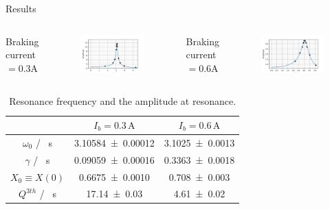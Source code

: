 \begin{frame}{Results}
\vspace{0.3cm}
\begin{columns}
\Large \centering Braking current $=0.3\si{\ampere}$
\begin{figure}[t]
	\includegraphics[width=0.95\linewidth]{images/result03.png}
\end{figure}
\Large \centering Braking current $=0.6\si{\ampere}$
\begin{figure}[t]
	\includegraphics[width=0.95\linewidth]{images/result06.png}
\end{figure}
\end{columns}
\pause
  \begin{table}[ht]
  	\centering
  	\begin{tabular}{c c c}
  		\toprule
  		& $I_b=0.3\, \si{\ampere}$ & $I_b=0.6 \, \si{\ampere} $\\
  		\midrule
  		$\omega_0$ / \si{\per\second} & \num{3.10584 \pm 0.00012} & \num{3.1025 \pm 0.0013} \\
  		$\gamma$ / \si{\per\second} & \num{0.09059 \pm 0.00016} & \num{0.3363 \pm 0.0018} \\
  		$X_0 \equiv X(0)$ & \num{0.6675 \pm 0.0010} & \num{0.708 \pm 0.003} \\
  		$Q^{3th}$ / \si{\per\second} & \num{17.14 \pm 0.03} & \num{4.61 \pm 0.02} \\
  		\bottomrule
  	\end{tabular}
  	\caption{Resonance frequency and the amplitude at resonance.}
  	\label{table:resonance-infered-results}
  \end{table}
  
  
\end{frame}